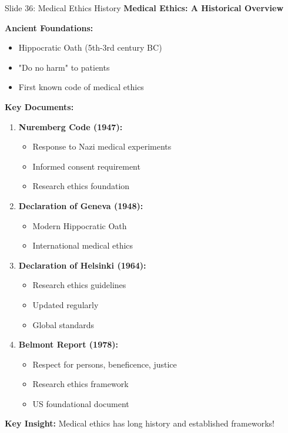 \documentclass[8pt]{beamer}
\begin{document}
	
	\begin{frame}{Slide 36: Medical Ethics History}
		\fontsize{6.5}{7.5}\selectfont
		\textbf{Medical Ethics: A Historical Overview}
		
		\vspace{0.1cm}
		\textbf{Ancient Foundations:}
		\begin{itemize}
			\item Hippocratic Oath (5th-3rd century BC)
			\item "Do no harm" to patients
			\item First known code of medical ethics
		\end{itemize}
		
		\vspace{0.1cm}
		\textbf{Key Documents:}
		\begin{enumerate}
			\item \textbf{Nuremberg Code (1947):}
			\begin{itemize}
				\item Response to Nazi medical experiments
				\item Informed consent requirement
				\item Research ethics foundation
			\end{itemize}
			\item \textbf{Declaration of Geneva (1948):}
			\begin{itemize}
				\item Modern Hippocratic Oath
				\item International medical ethics
			\end{itemize}
			\item \textbf{Declaration of Helsinki (1964):}
			\begin{itemize}
				\item Research ethics guidelines
				\item Updated regularly
				\item Global standards
			\end{itemize}
			\item \textbf{Belmont Report (1978):}
			\begin{itemize}
				\item Respect for persons, beneficence, justice
				\item Research ethics framework
				\item US foundational document
			\end{itemize}
		\end{enumerate}
		
		\textcolor{myblue}{\textbf{Key Insight:}} Medical ethics has \textcolor{myblue}{long history and established frameworks}!
	\end{frame}
	
\end{document}
